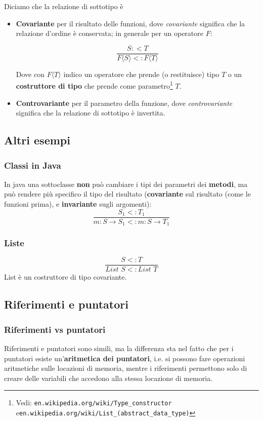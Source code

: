 \documentclass[a4paper,10pt]{article}
\begin{document}
Diciamo che la relazione di sottotipo è 
\begin{itemize}
 \item \textbf{Covariante} per il risultato delle funzioni, dove \emph{covariante} significa che la relazione d'ordine è conservata; in generale per un operatore $F$:
 
 \[ \dfrac{S :< T}{F\langle S\rangle <: F \langle T\rangle } \]
 
 Dove con $F\langle T \rangle$ indico un operatore che prende (o restituisce) tipo $T$ o un \textbf{costruttore di tipo} che prende come parametro\footnote{Vedi: \texttt{en.wikipedia.org/wiki/Type\_constructor} \quad e\quad \texttt{en.wikipedia.org/wiki/List\_(abstract\_data\_type)}} $T$.
 \item \textbf{Controvariante} per il parametro della funzione, dove \emph{controvariante} significa che la relazione di sottotipo è invertita.
\end{itemize}

 \subsection{Altri esempi}
 \subsubsection{Classi in Java}
 In java una sottoclasse \textbf{non} può cambiare i tipi dei parametri dei \textbf{metodi}, ma può rendere più specifico il tipo del risultato (\textbf{covariante} sul risultato (come le funzioni prima), e \textbf{invariante} sugli argomenti):
 \[ \dfrac{S_1 <: T_1}{m : S \to S_1 <: m : S \to T_1} \]
 \subsubsection{Liste}
 \[ \dfrac {S <: T}{List\,\,S <: List\,\,T} \]
List è un costruttore di tipo covariante.

\subsection{Riferimenti e puntatori}
\subsubsection{Riferimenti vs puntatori}
Riferimenti e puntatori sono simili, ma la differenza sta nel fatto che per i puntatori esiste un'\textbf{aritmetica dei puntatori}, i.e. si possono fare operazioni aritmetiche sulle locazioni di memoria, mentre i riferimenti permettono solo di creare delle variabili che accedono alla stessa locazione di memoria.
\end{document}
